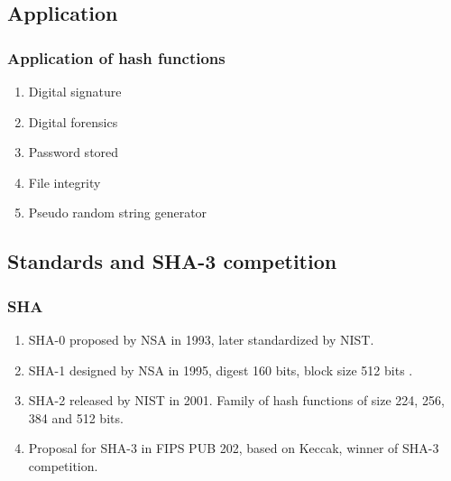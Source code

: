 \documentclass{beamer}
\begin{document}

\subsection{Application}
\begin{frame}
\frametitle{Application of hash functions}
\begin{enumerate}
\item Digital signature
\item Digital forensics \footnotemark
\item Password stored 
\item File integrity
\item Pseudo random string generator
\end{enumerate}
\end{frame}

\subsection{Standards and SHA-3 competition}

\begin{frame}
  \frametitle{SHA}
  \begin{enumerate}
    \item SHA-0 proposed by NSA in 1993, later standardized by NIST.
    \item SHA-1 designed by NSA in 1995, digest 160 bits, block size 512 bits \footnotemark.
    \item SHA-2 released by NIST in 2001. Family of hash functions of size 224, 256, 384 and 512 bits.
    \item Proposal for SHA-3 in FIPS PUB 202, based on Keccak, winner of SHA-3 competition.
  \end{enumerate}
\end{frame}
\end{document}
